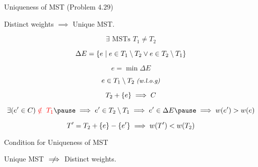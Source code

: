 
\begin{frame}{}
  \centerline{}
\end{frame}

\begin{frame}{}
  \begin{exampleblock}{Uniqueness of MST (Problem $4.29$)}
    \centerline{Distinct weights $\implies$ Unique MST.}
  \end{exampleblock}

  \pause
  \vspace{0.50cm}
  \centerline{}

  \pause
  \[
    \exists \text{ MSTs } T_1 \neq T_2
  \]

  \pause
  \[
    \Delta E = \left\{e \mid e \in T_1 \setminus T_2 \lor e \in T_2 \setminus T_1\right\}
  \]

  \pause
  \[
    e = \min \Delta E
  \]

  \pause
  \[
    e \in T_1 \setminus T_2 \;\text{\small \it (w.l.o.g)}
  \]
\end{frame}

\begin{frame}{}

  \pause
  \vspace{-0.30cm}
  \[
    T_2 + \left\{e\right\} \implies C
  \]

  \pause
  \vspace{-0.30cm}
  \[
    \exists (e' \in C) \red{\;\notin\; T_1} \pause \implies e' \in T_{2} \setminus T_{1} \implies e' \in \Delta E \pause \implies w(e') > w(e)
  \]

  \pause
  \vspace{-0.50cm}
  \[
    T' = T_{2} + \left\{e\right\} - \left\{e'\right\} \implies w(T') < w(T_{2})
  \]
\end{frame}

\begin{frame}{}
  \begin{exampleblock}{Condition for Uniqueness of MST}
    \centerline{Unique MST $\centernot\implies$ Distinct weights.}
  \end{exampleblock}

  \pause
\end{frame}


